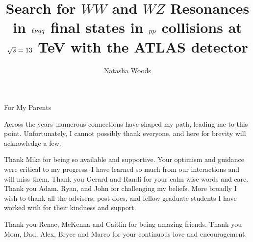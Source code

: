 





\title{Search for $WW$ and $WZ$ Resonances in $\ell\nu \MakeLowercase{qq}$ final states in $\MakeLowercase{pp}$ collisions at $\sqrt{\MakeLowercase{s}}=13$ TeV with the ATLAS detector}
\author{Natasha Woods}
\deanlinethree{}

\begin{frontmatter}
\maketitle

\copyrightpage

\tableofcontents


\listoffigures

\listoftables
\begin{abstract}

\end{abstract}

\begin{dedication}
\vspace*{\fill}
\begin{center}
For My Parents
\end{center}
\vspace*{\fill}
\end{dedication}
\begin{acknowledgements}
Across the years ,numerous connections have shaped my path, leading me to this point. Unfortunately, I cannot possibly thank everyone, and here for brevity will acknowledge a few.

Thank Mike for being so available and supportive. Your optimism and guidance were critical to my progress. I have learned so much from our interactions and will miss them. Thank you Gerard and Randi for your calm wise words and care. Thank you Adam, Ryan, and John for challenging my beliefs. More broadly I wish to thank all the advisers, post-docs, and fellow graduate students I have worked with for their kindness and support. 

Thank you Renae, McKenna and Caitlin for being amazing friends. Thank you Mom, Dad, Alex, Bryce and Marco for your continuous love and encouragement. 
\end{acknowledgements}

\end{frontmatter}
